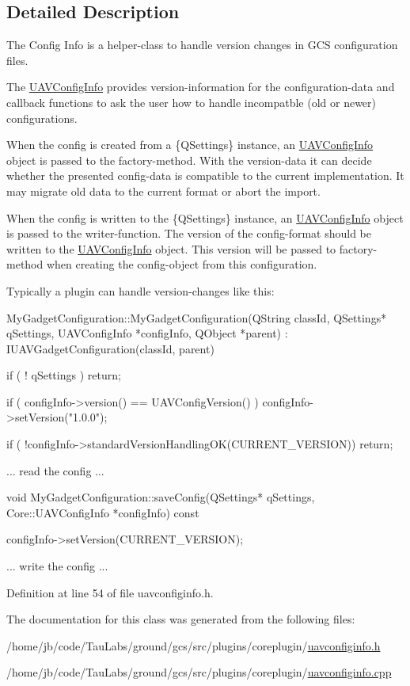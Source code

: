 \subsection{\-Detailed \-Description}
\-The \-Config \-Info is a helper-\/class to handle version changes in \-G\-C\-S configuration files. 

\-The \hyperlink{class_core_1_1_u_a_v_config_info}{\-U\-A\-V\-Config\-Info} provides version-\/information for the configuration-\/data and callback functions to ask the user how to handle incompatble (old or newer) configurations.

\-When the config is created from a \{\-Q\-Settings\} instance, an \hyperlink{class_core_1_1_u_a_v_config_info}{\-U\-A\-V\-Config\-Info} object is passed to the factory-\/method. \-With the version-\/data it can decide whether the presented config-\/data is compatible to the current implementation. \-It may migrate old data to the current format or abort the import.

\-When the config is written to the \{\-Q\-Settings\} instance, an \hyperlink{class_core_1_1_u_a_v_config_info}{\-U\-A\-V\-Config\-Info} object is passed to the writer-\/function. \-The version of the config-\/format should be written to the \hyperlink{class_core_1_1_u_a_v_config_info}{\-U\-A\-V\-Config\-Info} object. \-This version will be passed to factory-\/method when creating the config-\/object from this configuration.

\-Typically a plugin can handle version-\/changes like this\-: 
\begin{DoxyCode}
    MyGadgetConfiguration::MyGadgetConfiguration(QString classId, QSettings* 
      qSettings, UAVConfigInfo *configInfo, QObject *parent) :
        IUAVGadgetConfiguration(classId, parent)
    {
        if ( ! qSettings )
            return;

        if ( configInfo->version() == UAVConfigVersion() )
            configInfo->setVersion("1.0.0");

        if ( !configInfo->standardVersionHandlingOK(CURRENT_VERSION))
            return;

        ... read the config ...
    }

    void MyGadgetConfiguration::saveConfig(QSettings* qSettings, 
      Core::UAVConfigInfo *configInfo) const {

        configInfo->setVersion(CURRENT_VERSION);

        ... write the config ...
    }
\end{DoxyCode}


\-Definition at line 54 of file uavconfiginfo.\-h.



\-The documentation for this class was generated from the following files\-:\begin{DoxyCompactItemize}
\item 
/home/jb/code/\-Tau\-Labs/ground/gcs/src/plugins/coreplugin/\hyperlink{uavconfiginfo_8h}{uavconfiginfo.\-h}\item 
/home/jb/code/\-Tau\-Labs/ground/gcs/src/plugins/coreplugin/\hyperlink{uavconfiginfo_8cpp}{uavconfiginfo.\-cpp}\end{DoxyCompactItemize}
